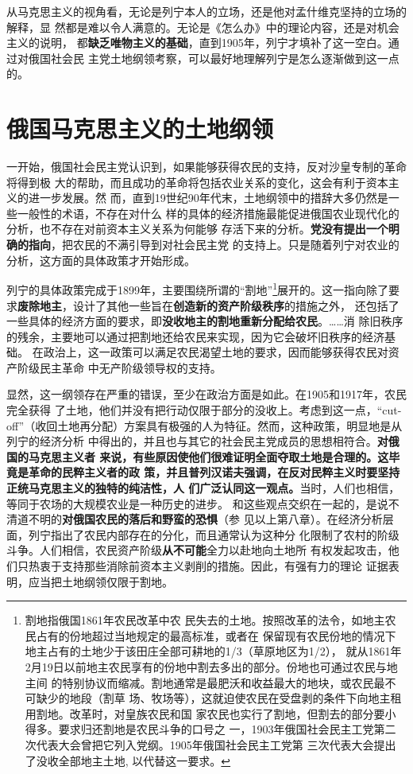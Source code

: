 从马克思主义的视角看，无论是列宁本人的立场，还是他对孟什维克坚持的立场的解释，显
然都是难以令人满意的。无论是《怎么办》中的理论内容，还是对机会主义的说明，
都\textbf{缺乏唯物主义的基础}，直到1905年，列宁才填补了这一空白。通过对俄国社会民
主党土地纲领考察，可以最好地理解列宁是怎么逐渐做到这一点的。

\section{俄国马克思主义的土地纲领}
一开始，俄国社会民主党认识到，如果能够获得农民的支持，反对沙皇专制的革命将得到极
大的帮助，而且成功的革命将包括农业关系的变化，这会有利于资本主义的进一步发展。然
而，直到19世纪90年代末，土地纲领中的措辞大多仍然是一些一般性的术语，不存在对什么
样的具体的经济措施最能促进俄国农业现代化的分析，也不存在对前资本主义关系为何能够
存活下来的分析。\textbf{党没有提出一个明确的指向}，把农民的不满引导到对社会民主党
的支持上。只是随着列宁对农业的分析，这方面的具体政策才开始形成。

列宁的具体政策完成于1899年，主要围绕所谓的“割地”\footnote{割地指俄国1861年农民改革中农
民失去的土地。按照改革的法令，如地主农民占有的份地超过当地规定的最高标准，或者在
保留现有农民份地的情况下地主占有的土地少于该田庄全部可耕地的1/3（草原地区为1/2），
就从1861年2月19日以前地主农民享有的份地中割去多出的部分。份地也可通过农民与地主间
的特别协议而缩减。割地通常是最肥沃和收益最大的地块，或农民最不可缺少的地段（割草
场、牧场等），这就迫使农民在受盘剥的条件下向地主租用割地。改革时，对皇族农民和国
家农民也实行了割地，但割去的部分要小得多。要求归还割地是农民斗争的口号之
一，1903年俄国社会民主工党第二次代表大会曾把它列入党纲。1905年俄国社会民主工党第
三次代表大会提出了没收全部地主土地, 以代替这一要求。}展开的。这一指向除了要
求\textbf{废除地主}，设计了其他一些旨在\textbf{创造新的资产阶级秩序}的措施之外，
还包括了一些具体的经济方面的要求，即\textbf{没收地主的割地重新分配给农民}。……消
除旧秩序的残余，主要地可以通过把割地还给农民来实现，因为它会破坏旧秩序的经济基础。
在政治上，这一政策可以满足农民渴望土地的要求，因而能够获得农民对资产阶级民主革命
中无产阶级领导权的支持。

显然，这一纲领存在严重的错误，至少在政治方面是如此。在1905和1917年，农民完全获得
了土地，他们并没有把行动仅限于部分的没收上。考虑到这一点，“cut-off”（收回土地再分配）方案具有极强的人为特征。然而，这种政策，明显地是从列宁的经济分析
中得出的，并且也与其它的社会民主党成员的思想相符合。\textbf{对俄国的马克思主义者
  来说，有些原因使他们很难证明全面夺取土地是合理的。这毕竟是革命的民粹主义者的政
  策，并且普列汉诺夫强调，在反对民粹主义时要坚持正统马克思主义的独特的纯洁性，人
  们广泛认同这一观点。}当时，人们也相信，等同于农场的大规模农业是一种历史的进步。
和这些观点交织在一起的，是说不清道不明的\textbf{对俄国农民的落后和野蛮的恐惧}（参
见以上第八章）。在经济分析层面，列宁指出了农民内部存在的分化，而且通常认为这种分
化限制了农村的阶级斗争。人们相信，农民资产阶级\textbf{从不可能}全力以赴地向土地所
有权发起攻击，他们只热衷于支持那些消除前资本主义剥削的措施。因此，有强有力的理论
证据表明，应当把土地纲领仅限于割地。

